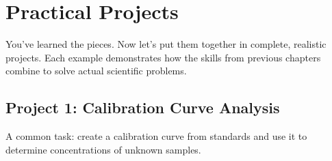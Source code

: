 
\chapter{Practical Projects}
\label{chap:practical}

You've learned the pieces. Now let's put them together in complete, realistic projects. Each example demonstrates how the skills from previous chapters combine to solve actual scientific problems.

\section{Project 1: Calibration Curve Analysis}
\label{sec:project-calibration}

A common task: create a calibration curve from standards and use it to determine concentrations of unknown samples.

